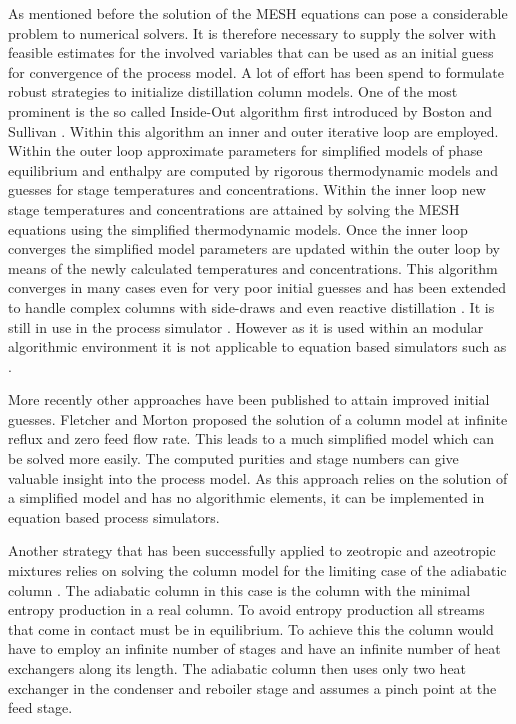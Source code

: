         As mentioned before the solution of the MESH equations can pose a considerable problem
        to numerical solvers. It is therefore necessary to supply the solver with feasible
        estimates for the involved variables that can be used as an initial guess for
        convergence of the process model. A lot of effort has been spend to formulate robust strategies
        to initialize distillation column models. One of the most prominent is the so called
        Inside-Out algorithm first introduced by Boston and Sullivan \cite{Boston.1974}. Within this
        algorithm an inner and outer iterative loop are employed. Within the outer loop approximate
        parameters for simplified models of phase equilibrium and enthalpy are computed by rigorous
        thermodynamic models and guesses for stage temperatures and concentrations. Within the
        inner loop new stage temperatures and concentrations are attained by solving the MESH equations
        using the simplified thermodynamic models. Once the inner loop converges the simplified
        model parameters are updated within the outer loop by means of the newly calculated
        temperatures and concentrations. This algorithm converges in many cases even for very poor initial
        guesses and has been extended to handle complex columns with side-draws and even reactive
        distillation \cite{Boston.}. It is still in use in the process simulator \aspen.
        However as it is used within an modular algorithmic environment it is not applicable
        to equation based simulators such as \gproms.

        More recently other approaches have been published to attain improved initial guesses.
        Fletcher and Morton \cite{Fletcher.2000} proposed the solution of a column model at
        infinite reflux and zero feed flow rate. This leads to a much simplified model which can
        be solved more easily. The computed purities and stage numbers can give valuable insight
        into the process model. As this approach relies on the solution of a simplified model
        and has no algorithmic elements, it can be implemented in equation based process simulators.

        Another strategy that has been successfully applied to zeotropic and azeotropic mixtures
        relies on solving the column model for the limiting case of the adiabatic column \cite{Barttfeld.2002}.
        The adiabatic column in this case is the column with the minimal entropy production in a real column.
        To avoid entropy production all streams that come in contact must be in equilibrium. To achieve this
        the column would have to employ an infinite number of stages and have an infinite number of
        heat exchangers along its length. The adiabatic column then uses only two heat exchanger in the
        condenser and reboiler stage and assumes a pinch point at the feed stage. 

